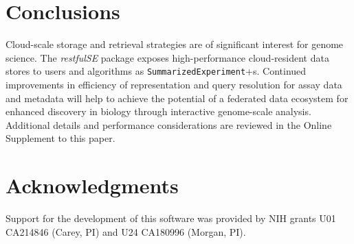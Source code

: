 \documentclass[applications]{gen-bioinformatics}
\newcommand{\Biocpackage}[1]{{\textit{#1}}}
\newcommand{\CRANpackage}[1]{{\emph{\href{https://cran.r-project.org/web/packages/#1/index.html}{#1}}}}
\newcommand{\CRANpackageFirst}[1]{{\emph{\href{https://cran.r-project.org/web/packages/#1/index.html}{#1}}}}
\newcommand{\Rclass}[1]{{\texttt{#1}}}
\begin{document}
%

\section*{Conclusions}

Cloud-scale storage and retrieval strategies are of significant
interest for genome science.  
The \Biocpackage{restfulSE} package exposes high-performance
cloud-resident data stores to users and
algorithms as \texttt{SummarizedExperiment}+s.  Continued improvements
in efficiency of
representation and query resolution for assay data and metadata
will help to achieve the potential of a federated data ecosystem for
enhanced discovery in biology through interactive genome-scale analysis.
Additional details and performance considerations are reviewed
in the Online Supplement to this paper.

\section*{Acknowledgments}
Support for the development of this software was provided by NIH grants
U01 CA214846 (Carey, PI) and U24 CA180996 (Morgan, PI).


\end{document}
